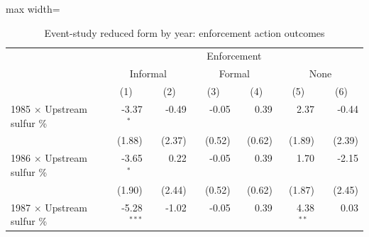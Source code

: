 \begin{table}[htbp]
\raggedright
\begin{minipage}{\linewidth}
\caption{\label{tab:es_rf_coefs_h3_k2} Event-study reduced form by year: enforcement action outcomes}
\end{minipage}
\small
{\setlength{\tabcolsep}{4pt}%
\begin{adjustbox}{max width=\linewidth}
\begin{tabular}{lrrrrrr}
\toprule
 & \multicolumn{6}{c}{Enforcement} \\
 & \multicolumn{2}{c}{Informal} & \multicolumn{2}{c}{Formal} & \multicolumn{2}{c}{None} \\
 & \multicolumn{1}{c}{(1)} & \multicolumn{1}{c}{(2)} & \multicolumn{1}{c}{(3)} & \multicolumn{1}{c}{(4)} & \multicolumn{1}{c}{(5)} & \multicolumn{1}{c}{(6)} \\
\hline
1985 $\times$ Upstream sulfur \% & \phantom{(}-3.37$^{*\phantom{*}\phantom{*}}$ & \phantom{(}-0.49$^{\phantom{*}\phantom{*}\phantom{*}}$ & \phantom{(}-0.05$^{\phantom{*}\phantom{*}\phantom{*}}$ & \phantom{(}\phantom{-}0.39$^{\phantom{*}\phantom{*}\phantom{*}}$ & \phantom{(}\phantom{-}2.37$^{\phantom{*}\phantom{*}\phantom{*}}$ & \phantom{(}-0.44$^{\phantom{*}\phantom{*}\phantom{*}}$ \\
 & (\phantom{-}1.88)\phantom{$^{***}$} & (\phantom{-}2.37)\phantom{$^{***}$} & (\phantom{-}0.52)\phantom{$^{***}$} & (\phantom{-}0.62)\phantom{$^{***}$} & (\phantom{-}1.89)\phantom{$^{***}$} & (\phantom{-}2.39)\phantom{$^{***}$} \\
1986 $\times$ Upstream sulfur \% & \phantom{(}-3.65$^{*\phantom{*}\phantom{*}}$ & \phantom{(}\phantom{-}0.22$^{\phantom{*}\phantom{*}\phantom{*}}$ & \phantom{(}-0.05$^{\phantom{*}\phantom{*}\phantom{*}}$ & \phantom{(}\phantom{-}0.39$^{\phantom{*}\phantom{*}\phantom{*}}$ & \phantom{(}\phantom{-}1.70$^{\phantom{*}\phantom{*}\phantom{*}}$ & \phantom{(}-2.15$^{\phantom{*}\phantom{*}\phantom{*}}$ \\
 & (\phantom{-}1.90)\phantom{$^{***}$} & (\phantom{-}2.44)\phantom{$^{***}$} & (\phantom{-}0.52)\phantom{$^{***}$} & (\phantom{-}0.62)\phantom{$^{***}$} & (\phantom{-}1.87)\phantom{$^{***}$} & (\phantom{-}2.45)\phantom{$^{***}$} \\
1987 $\times$ Upstream sulfur \% & \phantom{(}-5.28$^{***}$ & \phantom{(}-1.02$^{\phantom{*}\phantom{*}\phantom{*}}$ & \phantom{(}-0.05$^{\phantom{*}\phantom{*}\phantom{*}}$ & \phantom{(}\phantom{-}0.39$^{\phantom{*}\phantom{*}\phantom{*}}$ & \phantom{(}\phantom{-}4.38$^{**\phantom{*}}$ & \phantom{(}\phantom{-}0.03$^{\phantom{*}\phantom{*}\phantom{*}}$ \\

\end{tabular}
\end{adjustbox}}
\end{table}
